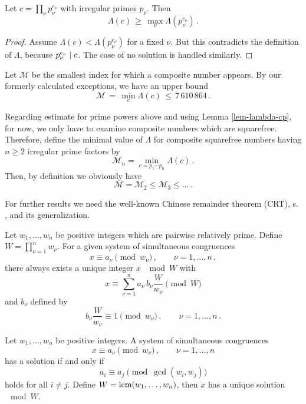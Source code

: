 \documentclass[12pt,english]{article}
\begin{document}
\begin{lemma} \label{lem-lambda-cp}
Let $c = \prod_{\nu} p_\nu^{e_\nu}$ with irregular primes $p_\nu$. Then
\[
   \Lambda( c ) \, \geq \,
     \max_\nu \Lambda(p_\nu^{e_\nu}) \,.
\]
\end{lemma}

\begin{proof} Assume $\Lambda( c ) < \Lambda( p_\nu^{e_\nu} )$ for a fixed $\nu$.
But this contradicts the definition of $\Lambda$, because $p_\nu^{e_\nu} \mid c$.
The case of no solution is handled similarly.
\end{proof}
\medskip

Let $\mathcal{M}$ be the smallest index for which a composite number appears.
By our formerly calculated exceptions, we have an upper bound
\begin{equation} \label{eqn-min-lambda}
    \mathcal{M} \,=\, \min_c \Lambda(c) \,\leq\, 7\,610\,864 \,.
\end{equation}

Regarding estimate  for prime powers
above and using Lemma \ref{lem-lambda-cp},
for now, we only have to examine composite numbers which are squarefree.
Therefore, define the minimal value of $\Lambda$ for composite squarefree numbers
having $n \geq 2$ irregular prime factors by
\[
    \mathcal{M}_n = \min_{c=p_1 \cdots p_n} \Lambda(c) \,.
\]
Then, by definition we obviously have
\[
   \mathcal{M} = \mathcal{M}_2 \leq \mathcal{M}_3 \leq \ldots \,.
\]

For further results we need the well-known Chinese remainder theorem (CRT), s.
\cite[p. 34]{ireland90classical}, and its generalization.

\begin{theorem}[CRT]
Let $w_1,\ldots,w_n$ be positive integers which are pairwise relatively prime.
Define $W = \prod_{\nu=1}^n w_\nu$.
For a given system of simultaneous congruences
\[
   x \equiv a_\nu \pmod{w_\nu} \,, \qquad \nu=1,\ldots,n \,,
\]
there always exists a unique integer $x$ $\mod{W}$ with
\[
    x \equiv \sum_{\nu=1}^n a_\nu \, b_\nu \frac{W}{w_\nu} \pmod{W}
\]
and $b_\nu$ defined by
\[
    b_\nu \frac{W}{w_\nu} \equiv 1 \pmod{w_\nu} \,, \qquad \nu=1,\ldots,n \,.
\]
\end{theorem}

\begin{theorem}[CRT']
Let $w_1,\ldots,w_n$ be positive integers.
A system of simultaneous congruences
\[
   x \equiv a_\nu \pmod{w_\nu} \,, \qquad \nu=1,\ldots,n
\]
has a solution if and only if
\[
   a_i \equiv a_j \pmod{\gcd(w_i,w_j)}
\]
holds for all $i \neq j$.
Define $W = \mathop{\rm lcm}\nolimits( w_1,\ldots,w_n )$, then $x$ has a unique solution $\mod{W}$.
\end{theorem}
\end{document}
